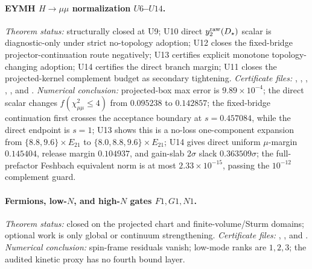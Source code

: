 \documentclass[aps,prd,onecolumn,notitlepage,nofootinbib,superscriptaddress,11pt,floatfix]{revtex4-2}
\begin{document}
\paragraph{EYMH \(H\to\mu\mu\) normalization \(U6\)--\(U14\).}
\emph{Theorem status:} structurally closed at U9; U10 direct \(y_2^{\rm raw}(D_\star)\) scalar is diagnostic-only under strict no-topology adoption; U12 closes the fixed-bridge projector-continuation route negatively; U13 certifies explicit monotone topology-changing adoption; U14 certifies the direct branch margin; U11 closes the projected-kernel complement budget as secondary tightening.
\emph{Certificate files:} , , , , , and .
\emph{Numerical conclusion:} projected-box max error is \(9.89\times10^{-4}\); the direct scalar changes \(f(\chi^2_{\mu\mu}\le4)\) from \(0.095238\) to \(0.142857\); the fixed-bridge continuation first crosses the acceptance boundary at \(s=0.457084\), while the direct endpoint is \(s=1\); U13 shows this is a no-loss one-component expansion from \(\{8.8,9.6\}\times E_{21}\) to \(\{8.0,8.8,9.6\}\times E_{21}\); U14 gives direct uniform \(\mu\)-margin \(0.145404\), release margin \(0.104937\), and gain-slab \(2\sigma\) slack \(0.363509\sigma\); the full-prefactor Feshbach equivalent norm is at most \(2.33\times10^{-15}\), passing the \(10^{-12}\) complement guard.

\paragraph{Fermions, low-\(N\), and high-\(N\) gates \(F1,G1,N1\).}
\emph{Theorem status:} closed on the projected chart and finite-volume/Sturm domains; optional work is only global or continuum strengthening.
\emph{Certificate files:} , , and .
\emph{Numerical conclusion:} spin-frame residuals vanish; low-mode ranks are \(1,2,3\); the audited kinetic proxy has no fourth bound layer.
\end{document}
